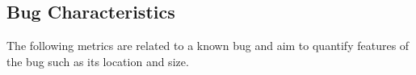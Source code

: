 \subsection{Bug Characteristics}

The following metrics are related to a known bug and aim to quantify features of
the bug such as its location and size.
